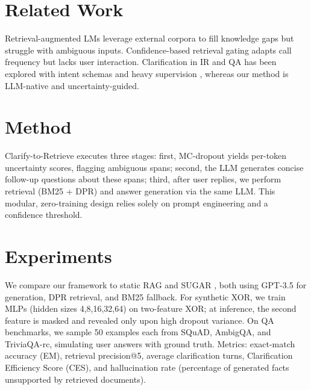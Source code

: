 \documentclass{article}
\begin{document}
\section{Related Work}
Retrieval-augmented LMs \cite{lewis2020retrievalaugmentedgf,guu2020realmrl,karpukhin2020densepr} leverage external corpora to fill knowledge gaps but struggle with ambiguous inputs. Confidence-based retrieval gating \cite{zubkova2025sugarlc,wang2023selfknowledgegr} adapts call frequency but lacks user interaction. Clarification in IR and QA has been explored with intent schemas and heavy supervision \cite{zhao2024generatingic,lee2023askingcq,min2020ambigqaaa}, whereas our method is LLM-native and uncertainty-guided.

\section{Method}
Clarify-to-Retrieve executes three stages: first, MC-dropout \cite{gal2015dropoutaa} yields per-token uncertainty scores, flagging ambiguous spans; second, the LLM generates concise follow-up questions about these spans; third, after user replies, we perform retrieval (BM25 + DPR) and answer generation via the same LLM. This modular, zero-training design relies solely on prompt engineering and a confidence threshold.

\section{Experiments}
We compare our framework to static RAG \cite{lewis2020retrievalaugmentedgf} and SUGAR \cite{zubkova2025sugarlc}, both using GPT-3.5 for generation, DPR retrieval, and BM25 fallback. For synthetic XOR, we train MLPs (hidden sizes 4,8,16,32,64) on two-feature XOR; at inference, the second feature is masked and revealed only upon high dropout variance. On QA benchmarks, we sample 50 examples each from SQuAD, AmbigQA, and TriviaQA-rc, simulating user answers with ground truth. Metrics: exact-match accuracy (EM), retrieval precision@5, average clarification turns, Clarification Efficiency Score (CES), and hallucination rate (percentage of generated facts unsupported by retrieved documents).
\end{document}

